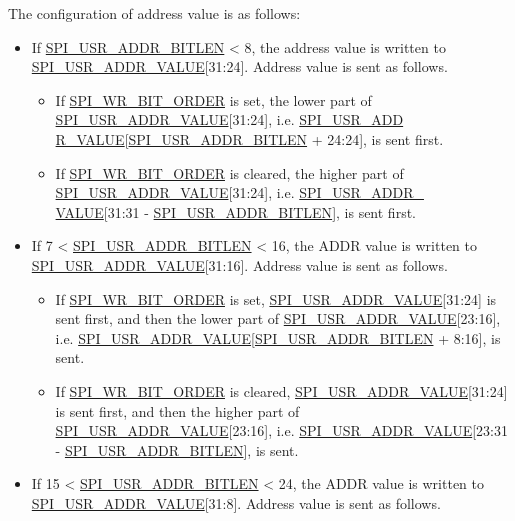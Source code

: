 \documentclass[main\_\_EN.tex]{subfiles}
\begin{document}
The configuration of address value is as follows:

\begin{itemize}

\item If \hyperref[fielddesc:SPIUSRADDRBITLEN]{SPI\_USR\_ADDR\_BITLEN} < 8, the address value is written to \hyperref[fielddesc:SPIUSRADDRVALUE]{SPI\_USR\_ADDR\_VALUE}[31:24]. Address value is sent as follows.
\begin{itemize}
    \item If \hyperref[fielddesc:SPIWRBITORDER]{SPI\_WR\_BIT\_ORDER} is set, the lower part of \hyperref[fielddesc:SPIUSRADDRVALUE]{SPI\_USR\_ADDR\_VALUE}[31:24], i.e. \hyperref[fielddesc:SPIUSRADDRVALUE]{SPI\_USR\_ADD\\R\_VALUE}[\hyperref[fielddesc:SPIUSRADDRBITLEN]{SPI\_USR\_ADDR\_BITLEN} + 24:24], is sent first.
    \item If \hyperref[fielddesc:SPIWRBITORDER]{SPI\_WR\_BIT\_ORDER} is cleared, the higher part of \hyperref[fielddesc:SPIUSRADDRVALUE]{SPI\_USR\_ADDR\_VALUE}[31:24], i.e. \hyperref[fielddesc:SPIUSRADDRVALUE]{SPI\_USR\_ADDR\_\\VALUE}[31:31 - \hyperref[fielddesc:SPIUSRADDRBITLEN]{SPI\_USR\_ADDR\_BITLEN}], is sent first.
\end{itemize}

\item  If 7 < \hyperref[fielddesc:SPIUSRADDRBITLEN]{SPI\_USR\_ADDR\_BITLEN} < 16, the ADDR value is written to \hyperref[fielddesc:SPIUSRADDRVALUE]{SPI\_USR\_ADDR\_VALUE}[31:16]. Address value is sent as follows.
\begin{itemize}
    \item If \hyperref[fielddesc:SPIWRBITORDER]{SPI\_WR\_BIT\_ORDER} is set, \hyperref[fielddesc:SPIUSRADDRVALUE]{SPI\_USR\_ADDR\_VALUE}[31:24] is sent first, and then the lower part of  \hyperref[fielddesc:SPIUSRADDRVALUE]{SPI\_USR\_ADDR\_VALUE}[23:16], i.e. \hyperref[fielddesc:SPIUSRADDRVALUE]{SPI\_USR\_ADDR\_VALUE}[\hyperref[fielddesc:SPIUSRADDRBITLEN]{SPI\_USR\_ADDR\_BITLEN} + 8:16], is sent.
    \item If \hyperref[fielddesc:SPIWRBITORDER]{SPI\_WR\_BIT\_ORDER} is cleared, \hyperref[fielddesc:SPIUSRADDRVALUE]{SPI\_USR\_ADDR\_VALUE}[31:24] is sent first, and then the higher part of \hyperref[fielddesc:SPIUSRADDRVALUE]{SPI\_USR\_ADDR\_VALUE}[23:16], i.e. \hyperref[fielddesc:SPIUSRADDRVALUE]{SPI\_USR\_ADDR\_VALUE}[23:31 - \hyperref[fielddesc:SPIUSRADDRBITLEN]{SPI\_USR\_ADDR\_BITLEN}], is sent.
\end{itemize}
\item If 15 < \hyperref[fielddesc:SPIUSRADDRBITLEN]{SPI\_USR\_ADDR\_BITLEN} < 24, the ADDR value is written to \hyperref[fielddesc:SPIUSRADDRVALUE]{SPI\_USR\_ADDR\_VALUE}[31:8]. Address value is sent as follows.


\end{itemize}
\end{document}
